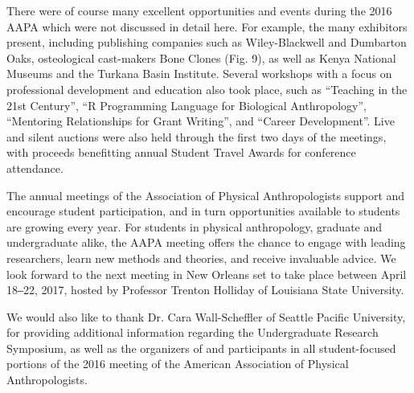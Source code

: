 \documentclass[english]{ijsra}
\begin{document}
There  were of course many excellent opportunities and events during the 2016 AAPA which were not discussed in detail here.
For example, the many exhibitors present, including publishing companies such as Wiley-Blackwell and Dumbarton Oaks,
osteological cast-makers Bone Clones (Fig. 9), as well as Kenya National Museums and the Turkana Basin Institute. 
Several workshops with a focus on professional development and education also took place, such as “Teaching in the 21st Century”,
“R Programming Language for Biological Anthropology”, “Mentoring Relationships for Grant Writing”, and  “Career Development”.
Live and silent auctions were also held through the first two days of the meetings, 
with proceeds benefitting annual Student Travel Awards for conference attendance.

The annual meetings of the Association of Physical Anthropologists support and encourage student participation,
and in turn opportunities available to students are growing every year. For students in physical anthropology, 
graduate and undergraduate alike, the AAPA meeting offers the chance to engage with leading researchers,
learn new methods and theories, and receive invaluable advice. 
We look forward to the next meeting in New Orleans set to take place between April 18‒22, 2017, 
hosted by Professor Trenton Holliday of Louisiana State University.

We  would also like to thank Dr. Cara Wall-Scheffler of Seattle Pacific University,  
for providing additional information regarding the Undergraduate Research Symposium,
as well as the organizers of and participants in all student-focused portions of the 2016 meeting of
the American Association of Physical Anthropologists.
\IJSRAclosing%
\end{document}
